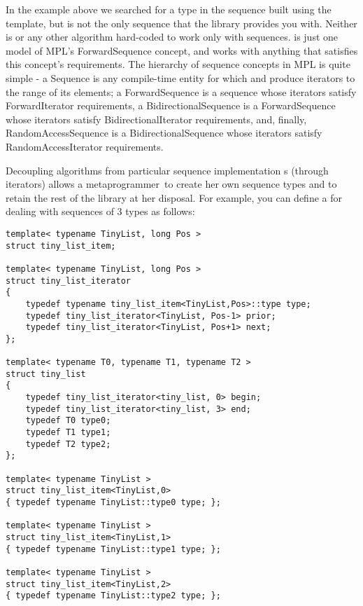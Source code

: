 \documentclass{kapproc}
\newcommand{\mpgmer}{meta\-pro\-gram\-mer}
\begin{document}
In the  example above we searched for a type in the
sequence built using the  template, but
 is not the only sequence that the library provides you
with. Neither is or any other algorithm
hard-coded to work only with  sequences.  is
just one model of MPL's ForwardSequence concept, and  works
with anything that satisfies this concept's requirements. The
hierarchy of sequence concepts in MPL is quite simple - a Sequence is
any compile-time entity for which  and 
produce iterators to the range of its elements; a ForwardSequence is a
sequence whose iterators satisfy ForwardIterator requirements, a
BidirectionalSequence is a ForwardSequence whose iterators satisfy
BidirectionalIterator requirements, and, finally, RandomAccessSequence
is a BidirectionalSequence whose iterators satisfy
RandomAccessIterator requirements.

Decoupling algorithms from particular sequence implementation s
(through iterators) allows a \mpgmer\ to create her own sequence types
and to retain the rest of the library at her disposal. For example,
you can define a  for dealing with sequences of 3
types as follows:

{\small
\begin{codesamp}\begin{verbatim}
template< typename TinyList, long Pos >
struct tiny_list_item;

template< typename TinyList, long Pos >
struct tiny_list_iterator
{
    typedef typename tiny_list_item<TinyList,Pos>::type type;
    typedef tiny_list_iterator<TinyList, Pos-1> prior;
    typedef tiny_list_iterator<TinyList, Pos+1> next;
};

template< typename T0, typename T1, typename T2 >
struct tiny_list
{
    typedef tiny_list_iterator<tiny_list, 0> begin;
    typedef tiny_list_iterator<tiny_list, 3> end;
    typedef T0 type0;
    typedef T1 type1;
    typedef T2 type2;
};

template< typename TinyList >
struct tiny_list_item<TinyList,0>
{ typedef typename TinyList::type0 type; };

template< typename TinyList >
struct tiny_list_item<TinyList,1>
{ typedef typename TinyList::type1 type; };

template< typename TinyList >
struct tiny_list_item<TinyList,2>
{ typedef typename TinyList::type2 type; };
\end{verbatim}
\end{codesamp}
}
\end{document}
